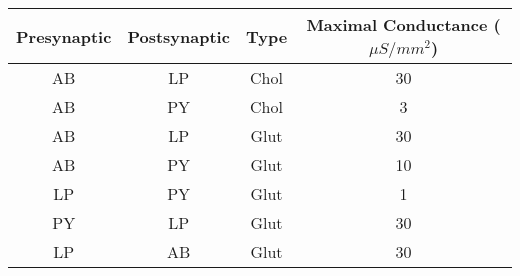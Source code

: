 \documentclass[utf8]{frontiers_suppmat} %
\begin{document}
		\begin{center}
			\begin{tabular}{|c|c|c|c|}
				\hline
				\textbf{Presynaptic} & \textbf{Postsynaptic} & \textbf{Type} & \textbf{Maximal Conductance} ($\mu S/mm^2$) \\
				\hline
				AB & LP & Chol & 30 \\ \hline
				AB & PY & Chol & 3 \\ \hline
				AB & LP & Glut & 30 \\ \hline
				AB & PY & Glut & 10 \\ \hline
				LP & PY & Glut & 1 \\ \hline
				PY & LP & Glut & 30 \\ \hline
				LP & AB & Glut & 30 \\ \hline
			\end{tabular}
		\end{center} 


\printbibliography
\end{document}
